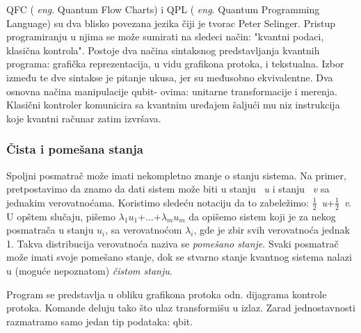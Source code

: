 \documentclass[a4paper]{article}
\begin{document}
{QFC ( \emph{eng}. Quantum Flow Charts) i QPL ( \emph{eng}. Quantum Programming Language) su dva blisko povezana jezika čiji je tvorac Peter Selinger.  Pristup programiranju u njima se može sumirati na sledeci način: "kvantni podaci, klasična kontrola". Postoje dva načina sintaksnog predstavljanja kvantnih programa: grafička reprezentacija, u vidu grafikona protoka, i tekstualna. Izbor između te dve sintakse je pitanje ukusa, jer su međusobno ekvivalentne. Dva osnovna načina manipulacije qubit- ovima: unitarne transformacije i merenja. Klasični kontroler komunicira sa kvantnim uređajem šaljući mu niz instrukcija koje kvantni računar zatim izvršava. 

\subsubsection{Čista i pomešana stanja}
Spoljni posmatrač može imati nekompletno znanje o stanju sistema. Na primer, pretpostavimo da znamo da dati sistem može biti u stanju ~\emph{u} i stanju ~\emph{v} sa jednakim verovatnoćama. Koristimo sledeću notaciju da to zabeležimo: \( \frac{1}{2} \){~\emph{u}}+\( \frac{1}{2} \){~\emph{v}}. U opštem slučaju, pišemo $\lambda_1${$u_1$}+$\ldots$+$\lambda_m${$u_m$} da opišemo sistem koji je za nekog posmatrača u stanju $u_i$, sa verovatnoćom $\lambda_i$, gde je zbir svih verovatnoća jednak 1. Takva distribucija verovatnoća naziva se \textit{pomešano stanje}. Svaki posmatrač može imati svoje pomešano stanje, dok se stvarno stanje kvantnog sistema nalazi u (moguće nepoznatom) \textit{čistom stanju}.


Program se predstavlja u obliku grafikona protoka odn. dijagrama kontrole protoka. Komande deluju tako što ulaz transformišu u izlaz. Zarad jednostavnosti razmatramo samo jedan tip podataka: qbit.

}
\end{document}
